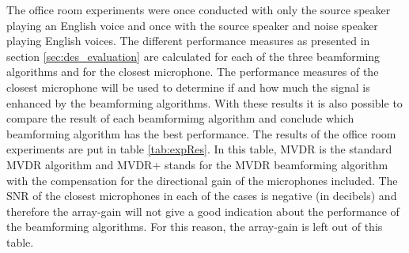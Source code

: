The office room experiments were once conducted with only the source speaker playing an English voice and once with the source speaker and noise speaker playing English voices. The different performance measures as presented in section \ref{sec:des_evaluation} are calculated for each of the three beamforming algorithms and for the closest microphone. The performance measures of the closest microphone will be used to determine if and how much the signal is enhanced by the beamforming algorithms. With these results it is also possible to compare the result of each beamformimg algorithm and conclude which beamforming algorithm has the best performance. The results of the office room experiments are put in table \ref{tab:expRes}. In this table, MVDR is the standard MVDR algorithm and MVDR+ stands for the MVDR beamforming algorithm with the compensation for the directional gain of the microphones included. The SNR of the closest microphones in each of the cases is negative (in decibels) and therefore the array-gain will not give a good indication about the performance of the beamforming algorithms. For this reason, the array-gain is left out of this table.



